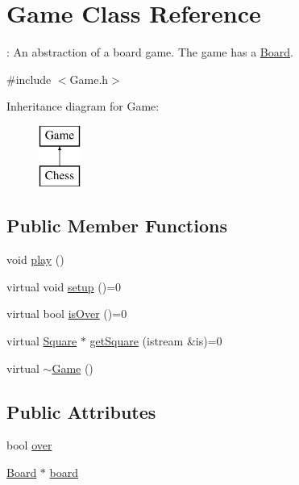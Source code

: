 \hypertarget{classGame}{}\section{Game Class Reference}
\label{classGame}


\+: An abstraction of a board game. The game has a \hyperlink{classBoard}{Board}.  




{\ttfamily \#include $<$Game.\+h$>$}

Inheritance diagram for Game\+:\begin{figure}[H]
\begin{center}
\leavevmode
\includegraphics[height=2.000000cm]{classGame}
\end{center}
\end{figure}
\subsection*{Public Member Functions}
\begin{DoxyCompactItemize}
\item 
void \hyperlink{classGame_aa333825d0bca80e91e53c7e23f053405}{play} ()
\item 
virtual void \hyperlink{classGame_a49067dcf360cfe353b9a99910136ac26}{setup} ()=0
\item 
virtual bool \hyperlink{classGame_ae3f5006e677b713fa7f85d906cde3dde}{is\+Over} ()=0
\item 
virtual \hyperlink{classSquare}{Square} $\ast$ \hyperlink{classGame_a36fc5e6874822115ff6685c608da50db}{get\+Square} (istream \&is)=0
\item 
virtual \hyperlink{classGame_a72772b628443c3675976d6b5e6c9ec2a}{$\sim$\+Game} ()
\end{DoxyCompactItemize}
\subsection*{Public Attributes}
\begin{DoxyCompactItemize}
\item 
bool \hyperlink{classGame_ae82939826eff0a8847cb822cf95227f4}{over}
\item 
\hyperlink{classBoard}{Board} $\ast$ \hyperlink{classGame_ae38e501e177586af48d2e2300b6be4ba}{board}
\end{DoxyCompactItemize}


